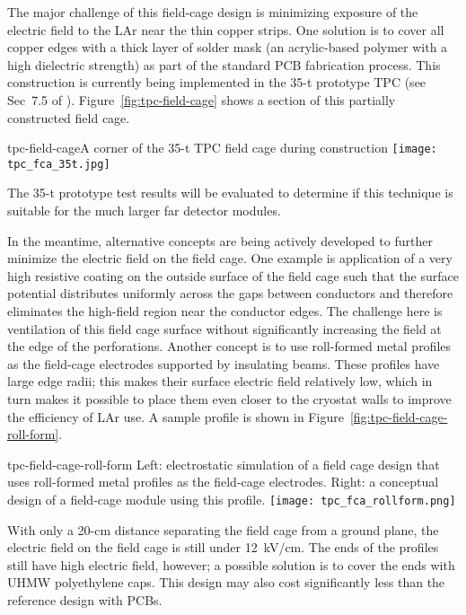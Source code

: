 The major challenge of this field-cage design is 
minimizing exposure of the electric field to the LAr
near the thin copper
strips.  One solution is to cover all copper edges with a thick layer
of solder mask (an acrylic-based polymer with a high dielectric
strength) as part of the standard PCB fabrication process.  This
construction is currently being implemented in the 35-t prototype TPC (see
Sec~7.5 of \anxlbnefd).  Figure~\ref{fig:tpc-field-cage} shows a
section of this partially constructed field cage.  
\begin{cdrfigure}{tpc-field-cage}{A corner of the 35-t TPC 
field cage during construction}
\texttt{[image: tpc\_fca\_35t.jpg]}
\end{cdrfigure}
The 35-t prototype test results will be evaluated to determine if this
technique is suitable for the much larger far detector modules.
 
In the meantime, alternative concepts are being actively developed to
further minimize the electric field on the field cage.  One example is application of %
a very high resistive  coating on the outside surface of the
field cage such that the surface potential distributes uniformly
across the gaps between conductors and therefore eliminates the high-field
region near the conductor edges.  The challenge here is %
ventilation of this field cage surface without significantly increasing the
field at the edge of the perforations.  Another concept is to use
roll-formed metal profiles as the field-cage electrodes supported by 
insulating beams.  These profiles have large edge radii; this makes
their surface electric field relatively low, which in turn makes it possible
to place them %
even closer to the cryostat walls to improve the
efficiency of LAr use.  %
A sample profile is shown in
Figure~\ref{fig:tpc-field-cage-roll-form}.  
\begin{cdrfigure}{tpc-field-cage-roll-form}
{Left: electrostatic simulation of a field cage design that uses roll-formed 
metal profiles as the field-cage electrodes.  Right: a conceptual design of a 
field-cage module using this profile.}
\texttt{[image: tpc\_fca\_rollform.png]}
\end{cdrfigure}
With only a 20-cm distance %
separating the field cage from a ground plane, the electric field on the field cage is
still under 12~kV/cm.  The ends of the profiles still have high
electric field, however; a possible solution is to cover the ends with UHMW
polyethylene caps.  This design may also cost significantly less than
the reference design with PCBs.


